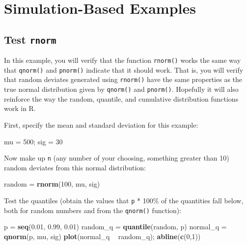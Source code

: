 \documentclass[]{book}
\newenvironment{Shaded}{\begin{snugshade}}{\end{snugshade}}
\newcommand{\DecValTok}[1]{\textcolor[rgb]{0.00,0.00,0.81}{#1}}
\newcommand{\FloatTok}[1]{\textcolor[rgb]{0.00,0.00,0.81}{#1}}
\newcommand{\KeywordTok}[1]{\textcolor[rgb]{0.13,0.29,0.53}{\textbf{#1}}}
\newcommand{\NormalTok}[1]{#1}
\newcommand{\OperatorTok}[1]{\textcolor[rgb]{0.81,0.36,0.00}{\textbf{#1}}}
\newcommand{\StringTok}[1]{\textcolor[rgb]{0.31,0.60,0.02}{#1}}
\begin{document}
\hypertarget{sim-examples}{%
\section{Simulation-Based Examples}\label{sim-examples}}

\hypertarget{rnorm-ex}{%
\subsection{\texorpdfstring{Test \texttt{rnorm}}{Test rnorm}}\label{rnorm-ex}}

In this example, you will verify that the function \texttt{rnorm()} works the same way that \texttt{qnorm()} and \texttt{pnorm()} indicate that it should work. That is, you will verify that random deviates generated using \texttt{rnorm()} have the same properties as the true normal distribution given by \texttt{qnorm()} and \texttt{pnorm()}. Hopefully it will also reinforce the way the random, quantile, and cumulative distribution functions work in R.

First, specify the mean and standard deviation for this example:

\begin{Shaded}
\begin{Highlighting}[]
\NormalTok{mu =}\StringTok{ }\DecValTok{500}\NormalTok{; sig =}\StringTok{ }\DecValTok{30}
\end{Highlighting}
\end{Shaded}

Now make up \texttt{n} (any number of your choosing, something greater than 10) random deviates from this normal distribution:

\begin{Shaded}
\begin{Highlighting}[]
\NormalTok{random =}\StringTok{ }\KeywordTok{rnorm}\NormalTok{(}\DecValTok{100}\NormalTok{, mu, sig)}
\end{Highlighting}
\end{Shaded}

Test the quantiles (obtain the values that \texttt{p} * 100\% of the quantities fall below, both for random numbers and from the \texttt{qnorm()} function):

\begin{Shaded}
\begin{Highlighting}[]
\NormalTok{p =}\StringTok{ }\KeywordTok{seq}\NormalTok{(}\FloatTok{0.01}\NormalTok{, }\FloatTok{0.99}\NormalTok{, }\FloatTok{0.01}\NormalTok{)}
\NormalTok{random_q =}\StringTok{ }\KeywordTok{quantile}\NormalTok{(random, p)}
\NormalTok{normal_q =}\StringTok{ }\KeywordTok{qnorm}\NormalTok{(p, mu, sig)}
\KeywordTok{plot}\NormalTok{(normal_q }\OperatorTok{~}\StringTok{ }\NormalTok{random_q); }\KeywordTok{abline}\NormalTok{(}\KeywordTok{c}\NormalTok{(}\DecValTok{0}\NormalTok{,}\DecValTok{1}\NormalTok{))}
\end{Highlighting}
\end{Shaded}
\end{document}
